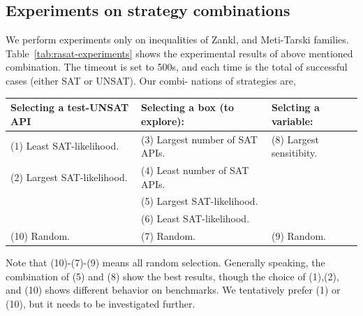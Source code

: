 \documentclass[runningheads,a4paper,oribibl]{llncs}
\begin{document}
\subsection{Experiments on strategy combinations} \label{sec:expstrategy}

We perform experiments only on inequalities of Zankl, and Meti-Tarski families. 
Table~\ref{tab:rasat-experiments} shows the experimental results of above mentioned combination. 
The timeout is set to 500s, and each time is the total of successful cases 
(either SAT or UNSAT). Our combi-
nations of strategies are,

\medskip
{\centering
\begin{tabular}{l|l|l}
Selecting a test-UNSAT API~~ & Selecting a box (to explore): & 
Selcting a variable: \\  %
\hline

(1) Least SAT-likelihood. & 
(3) Largest number of SAT APIs.~~ & 
(8) Largest sensitibity. \\

(2) Largest SAT-likelihood. & 
(4) Least number of SAT APIs. & \\

& (5) Largest SAT-likelihood. & \\

& (6) Least SAT-likelihood. & \\

(10) Random. & (7) Random. & (9) Random. \\
\end{tabular}
}
\medskip

Note that (10)-(7)-(9) means all random selection. 
Generally speaking, the combination of (5) and (8) show the best results, 
though the choice of (1),(2), and (10) shows different behavior on benchmarks. 
We tentatively prefer (1) or (10), but it needs to be investigated further. 
\end{document}
